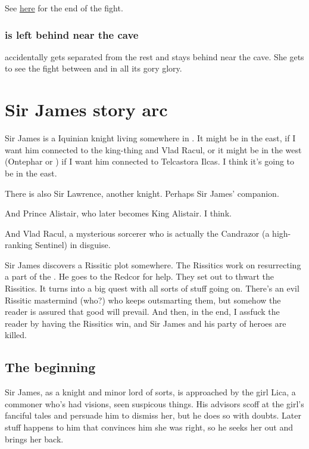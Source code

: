 \begin{garbage}
See \hyperref[Ishnaruchaefir kills Teshrial]{here} for the end of the fight.






\subsubsection{\Shilred{} is left behind near the cave}
\Shilred{} accidentally gets separated from the rest and stays behind near the cave. 
She gets to see the fight between \Ishnaruchaefir{} and \Teshrial{} in all its gory glory. 















\section{Sir James story arc}
Sir James is a \human{} Iquinian knight living somewhere in \Velcad{}. 
It might be in the east, if I want him connected to the king-thing and Vlad Racul, or it might be in the west (Ontephar or \Scyrum) if I want him connected to Telcastora Ilcas. 
I think it's going to be in the east. 

There is also Sir Lawrence, another knight. 
Perhaps Sir James' companion. 

And Prince Alistair, who later becomes King Alistair. 
I think. 

And Vlad Racul, a mysterious sorcerer who is actually the \dragon{} Candrazor (a high-ranking Sentinel) in disguise. 

Sir James discovers a Rissitic plot somewhere. 
The Rissitics work on resurrecting a part of the \Haskelek{} \daemon. 
He goes to the Redcor for help. They set out to thwart the Rissitics. 
It turns into a big quest with all sorts of stuff going on. 
There's an evil Rissitic mastermind (who?) who keeps outsmarting them, but somehow the reader is assured that good will prevail. 
And then, in the end, I assfuck the reader by having the Rissitics win, and Sir James and his party of heroes are killed. 




\subsection{The beginning}
Sir James, as a knight and minor lord of sorts, is approached by the girl Lica, a commoner who's had visions, seen suspicous things. 
His advisors scoff at the girl's fanciful tales and persuade him to dismiss her, but he does so with doubts. 
Later stuff happens to him that convinces him she was right, so he seeks her out and brings her back. 


\end{garbage}

